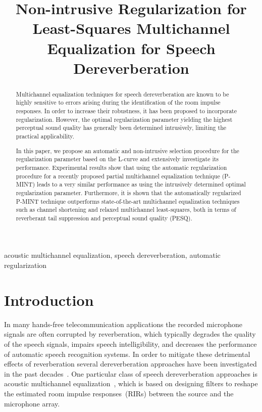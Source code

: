 \documentclass{article}
\title{Non-intrusive Regularization for Least-Squares Multichannel Equalization for Speech Dereverberation}
\begin{document}
\maketitle
%
\begin{abstract}
Multichannel equalization techniques for speech dereverberation are known to be highly sensitive to errors arising during the identification of the room impulse responses. 
In order to increase their robustness, it has been proposed to incorporate regularization. 
However, the optimal regularization parameter yielding the highest perceptual sound quality has generally been determined intrusively, limiting the practical applicability. 

In this paper, we propose an automatic and non-intrusive selection procedure for the regularization parameter based on the L-curve and extensively investigate its performance. 
Experimental results show that using the automatic regularization procedure for a recently proposed partial multichannel equalization technique (P-MINT) leads to a very similar performance as using the intrusively determined optimal regularization parameter. 
Furthermore, it is shown that the automatically regularized P-MINT technique outperforms state-of-the-art multichannel equalization techniques such as channel shortening and relaxed multichannel least-squares, both in terms of reverberant tail suppression and perceptual sound quality (PESQ).
\end{abstract}

\begin{keywords}
acoustic multichannel equalization, speech dereverberation, automatic regularization
\end{keywords}
%


\section{Introduction}
\label{sec: intro}
In many hands-free telecommunication applications the recorded microphone signals are often corrupted by reverberation, which typically degrades the quality of the speech signals, impairs speech intelligibility, and decreases the performance of automatic speech recognition systems. 
In order to mitigate these detrimental effects of reverberation several dereverberation approaches have been investigated in the past decades~\cite{Naylor_Derev_book}.
One particular class of speech dereverberation approaches is acoustic multichannel equalization~\cite{Miyoshi_ITASS_1988, Kallinger_ICASSP_2006, Zhang_IWAENC_2010, Kodrasi_ICASSP_2012}, which is based on designing filters to reshape the estimated room impulse responses~(RIRs) between the source and the microphone array.
\end{document}

